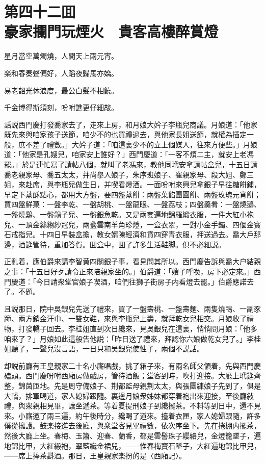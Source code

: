 
\chapter*{第四十二囬　\\豪家攔門玩煙火　貴客高樓醉賞燈}
\thispagestyle{empty}

\begin{myquote}
星月當空萬燭燒，人間天上兩元宵。

楽和春奏聲偏好，人蹈夜歸馬亦嬌。

易老韶光休浪度，最公白髮不相饒。

千金博得斯須刻，吩咐譙更仔細敲。
\end{myquote}

話説西門慶打發喬家去了，走來上房，和月娘大妗子李瓶兒商議。月娘道：「他家既先來與咱家孩子送節，咱少不的也買禮過去，與他家長姐送節，就權為插定一般，庶不差了禮數。」大妗子道：「咱這裏少不的立上個媒人，往來方便些。」月娘道：「他家是孔嫂兒，咱家安上誰好？」西門慶道：「一客不煩二主，就安上老馮罷。」於是連忙冩了請帖八個，就叫了老馮來，教他同玳安拿請帖盒兒，十五日請喬老親家母、喬五太太，并尚擧人娘子，朱序班娘子、崔親家母、段大姐、鄭三姐，來赴席，與李瓶兒做生日，并喫看燈酒。一面吩咐來興兒拿銀子早往糖餅鋪，早定下蒸酥點心，都用大方盤，要四盤蒸餅：兩盤菓餡團圓餅、兩盤玫瑰元宵餅；買四盤鮮菓：一盤李乾、一盤胡桃、一盤龍眼、一盤荔枝；四盤羹肴：一盤燒鵝、一盤燒鷄、一盤鴿子兒、一盤銀魚乾。又是兩套遍地錦羅緞衣服，一件大紅小袍兒、一頂金絲縐紗冠兒，兩盞雲南羊角珍燈，一盒衣翠，一對小金手鐲、四個金寳石戒指兒。十四日早裝盒擔，教女婿陳經濟和賁四穿青衣服，押送過去。喬大戶那邊，酒筵管待，重加答賀。囬盒中，囬了許多生活鞋脚。俱不必細説。

正亂着，應伯爵來講李智黄四關銀子事，看見問其所以。西門慶告訴與喬大户結親之事：「十五日好歹請令正來陪親家坐的。」伯爵道：「嫂子呼喚，房下必定來。」西門慶道：「今日請衆堂官娘子喫酒，咱們往獅子街房子内看燈去罷。」伯爵應諾去了。不題。

且説那日，院中吳銀兒先送了禮來，買了一盤壽桃、一盤壽麵、兩隻燒鴨、一副豕蹄、兩方銷金汗巾、一雙女鞋，來與李瓶兒上壽，就拜乾女兒相交。月娘收了禮物，打發轎子回去。李桂姐直到次日纔來，見吳銀兒在這裏，悄悄問月娘：「他多咱來了？」月娘如此這般告他説：「昨日送了禮來，拜認你六娘做乾女兒了。」李桂姐聽了，一聲兒沒言語，一日只和吴銀兒使性子，兩個不説話。

却説前廳有王皇親家二十名小廝唱戲，挑了箱子來，有兩名師父領着，先與西門慶磕頭。西門慶吩咐西廂房做戲房，管待酒飯；堂客到時，吹打迎接。大廳上玳筵齊整，錦茵匝地。先是周守備娘子、荆都監母親荆太太，與張團練娘子先到了，俱是大轎，排軍喝道，家人媳婦跟隨。裏邊月娘衆姊妹都穿着袍出來迎接，至後廳敍禮，與衆親相見畢，讓坐遞茶。等着夏提刑娘子到纔擺茶。不料等到日中，還不見來。小廝邀了兩三遍，約午後時分，纔喝了道來。擡着衣匣，家人媳婦跟隨，許多僕從擁護。鼓楽接進去後廳，與衆堂客見畢禮數，依次序坐下。先在捲棚内擺茶，然後大廳上坐。春梅、玉簫、迎春、蘭香，都是雲髻珠子纓絡兒，金燈籠墜子，遍地錦比甲，大紅緞袍，翠藍織金裙兒，——惟春梅寳石墜子，大紅遍地錦比甲兒，——席上捧茶斟酒。那日，王皇親家楽扮的是〈西廂記〉。

